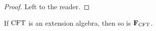 \begin{proof}
Left to the reader.
\end{proof}
\begin{comment}
\begin{proof}
It is straightforward to verify the equalities
\begin{align*}
\pullbackpr{1}{\ectxext}{\eft}\circ\beta_2\circ\eext{3}
  & = \beta_1\circ\eft[3]\circ\eft[4]
  \\
\pullbackpr{1}{\ectxext}{\eft}\circ\eext{2}\circ\beta_3
  & = \beta_1\circ\eft[3]\circ\eft[4].
\end{align*}
Thus, it remains to verify that
\begin{equation*}
\pullbackpr{2}{\ectxext}{\eft}\circ\beta_2\circ\eext{3}
  = \pullbackpr{2}{\ectxext}{\eft}\circ\eext{2}\circ\beta_3.
\end{equation*}
It is straightforward to see that the diagram
\begin{equation*}
\begin{tikzcd}[column sep=large]
\stesysf_4
  \ar{dd}[swap]{\pullback{\pullbackpr{2}{\efamext}{\eft[2]}}{\pullbackpr{2}{\efamext}{\eft[2]}}{\efamext}{\eft[2]}}
  \ar{r}{\eext{3}}
  &
\stesysf_3
  \ar{r}{\beta_2}
  \ar{d}[swap]{\pullbackpr{2}{\efamext}{\eft[2]}}
  &
\stesysf_2
  \ar{dd}{\pullbackpr{2}{\ectxext}{\eft}}
  \\
  {} &
\stesysf_2
  \ar{dr}{\beta_1}
  \\
\stesysf_3
  \ar{ur}{\eext{2}}
  \ar{r}[swap]{\beta_2}
  &
\stesysf_2
  \ar{r}[swap]{\efamext}
  &
\stesysf
\end{tikzcd}
\end{equation*}
commutes. It is likewise straightforward to see that the diagram
\begin{equation*}
\begin{tikzcd}
\stesysf_4
  \ar{r}{\beta_3}
  \ar{d}[swap]{\pullback{\pullbackpr{2}{\efamext}{\eft[2]}}{\pullbackpr{2}{\efamext}{\eft[2]}}{\efamext}{\eft[2]}}
  &
\stesysf_3
  \ar{r}{\eext{2}}
  \ar{d}[swap]{\beta_2}
  &
\stesysf_2
  \ar{d}{\pullbackpr{2}{\ectxext}{\eft}}
  \\
\stesysf_3
  \ar{r}[swap]{\beta_2}
  &
\stesysf_2
  \ar{r}[swap]{\efamext}
  &
\stesysf
\end{tikzcd}
\end{equation*}
commutes, completing our goal.
\end{proof}
\end{comment}

\begin{thm}\label{famextobj}
If $\mathrm{CFT}$ is an extension algebra, then so is $\mathbf{F}_{\mathrm{CFT}}$.
\end{thm}

